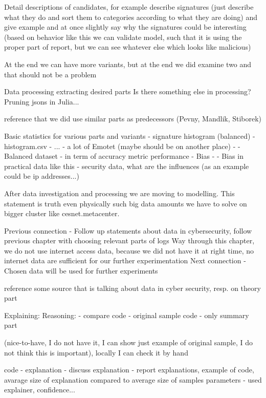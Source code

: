 Detail descriptions of candidates, for example describe signatures (just describe what they do and sort them to categories according to what they are doing) and give example and at once slightly say why the signatures could be interesting (based on behavior like this we can validate model, such that it is using the proper part of report, but we can see whatever else which looks like malicious)

At the end we can have more variants, but at the end we did examine two and that should not be a problem

Data processing
extracting desired parts
Is there something else in processing?
Pruning jsons in Julia...


reference that we did use similar parts as predecessors (Pevny, Mandlik, Stiborek)

Basic statistics for various parts and variants
  - signature histogram (balanced) - histogram.csv
  - ...
  - a lot of Emotet (maybe should be on another place)
  - - Balanced dataset - in term of accuracy metric performance
  - Bias - - Bias in practical data like this - security data, what are the influences (as an example could be ip addresses...)


After data investigation and processing we are moving to modelling. This statement is truth even physically such big data amounts we have to solve on bigger cluster like cesnet.metacenter.

Previous connection
- Follow up statements about data in cybersecurity, follow previous chapter with choosing relevant parts of logs
Way through this chapter, we do not use internet access data, because we did not have it at right time, no internet data are sufficient for our further experimentation
Next connection
- Chosen data will be used for further experiments


reference some source that is talking about data in cyber security, resp. on theory part
  


Explaining:
  Reasoning:
  - compare
    code - original sample
    code - only summary part

    (nice-to-have, I do not have it, I can show just example of original sample, I do not think this is important), locally I can check it by hand

    code - explanation
  - discuss explanation
  - report 
      explanations, example of code, avarage size of explanation compared to average size of samples
      parameters - used explainer, confidence...

